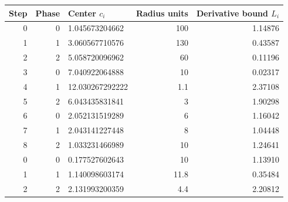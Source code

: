 \begin{center}\small
\begin{tabular}{rrlrr}\toprule
Step&Phase&Center $c_i$&Radius units&Derivative bound $L_i$\\\midrule
0&0&1.045673204662&100&1.14876\\
1&1&3.060567710576&130&0.43587\\
2&2&5.058720096962&60&0.11196\\
3&0&7.040922064888&10&0.02317\\
4&1&12.030267292222&1.1&2.37108\\
5&2&6.043435831841&3&1.90298\\
6&0&2.052131519289&6&1.16042\\
7&1&2.043141227448&8&1.04448\\
8&2&1.033231466989&10&1.24641\\\midrule
0&0&0.177527602643&10&1.13910\\
1&1&1.140098603174&11.8&0.35484\\
2&2&2.131993200359&4.4&2.20812\\\bottomrule
\end{tabular}
\end{center}

